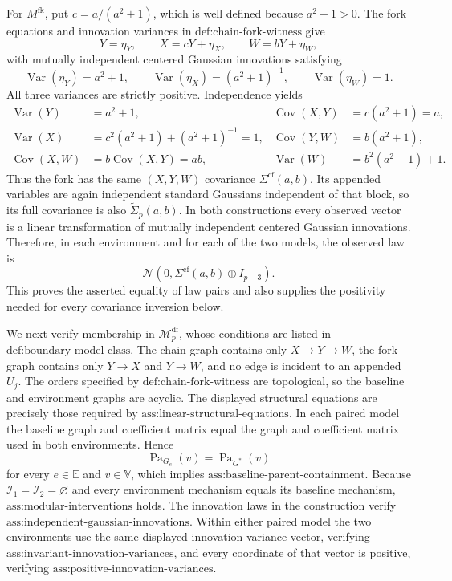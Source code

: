 For \(M^{\mathrm{fk}}\), put \(c=a/(a^2+1)\), which is well defined because \(a^2+1>0\). The fork equations and innovation variances in \(\text{def:chain-fork-witness}\) give
\[
Y=\eta_Y,\qquad X=cY+\eta_X,
\qquad W=bY+\eta_W,
\]
with mutually independent centered Gaussian innovations satisfying
\[
 \operatorname{Var}(\eta_Y)=a^2+1,
 \qquad \operatorname{Var}(\eta_X)=(a^2+1)^{-1},
 \qquad \operatorname{Var}(\eta_W)=1.
\]
All three variances are strictly positive. Independence yields
\[
\begin{aligned}
 \operatorname{Var}(Y)&=a^2+1,
 &\operatorname{Cov}(X,Y)&=c(a^2+1)=a,\\
 \operatorname{Var}(X)&=c^2(a^2+1)+(a^2+1)^{-1}=1,
 &\operatorname{Cov}(Y,W)&=b(a^2+1),\\
 \operatorname{Cov}(X,W)&=b\operatorname{Cov}(X,Y)=ab,
 &\operatorname{Var}(W)&=b^2(a^2+1)+1.
\end{aligned}
\]
Thus the fork has the same \((X,Y,W)\) covariance \(\Sigma^{\mathrm{cf}}(a,b)\). Its appended variables are again independent standard Gaussians independent of that block, so its full covariance is also \(\widetilde\Sigma_p(a,b)\). In both constructions every observed vector is a linear transformation of mutually independent centered Gaussian innovations. Therefore, in each environment and for each of the two models, the observed law is
\[
 \mathcal N\!\left(0,\Sigma^{\mathrm{cf}}(a,b)\oplus I_{p-3}\right).
\]
This proves the asserted equality of law pairs and also supplies the positivity needed for every covariance inversion below.

We next verify membership in \(\mathcal M_p^{\mathrm{df}}\), whose conditions are listed in \(\text{def:boundary-model-class}\). The chain graph contains only \(X\to Y\to W\), the fork graph contains only \(Y\to X\) and \(Y\to W\), and no edge is incident to an appended \(U_j\). The orders specified by \(\text{def:chain-fork-witness}\) are topological, so the baseline and environment graphs are acyclic. The displayed structural equations are precisely those required by \(\text{ass:linear-structural-equations}\). In each paired model the baseline graph and coefficient matrix equal the graph and coefficient matrix used in both environments. Hence
\[
 \operatorname{Pa}_{G_e}(v)=\operatorname{Pa}_{G^*}(v)
\]
for every \(e\in\mathbb E\) and \(v\in\mathbb V\), which implies \(\text{ass:baseline-parent-containment}\). Because \(\mathcal I_1=\mathcal I_2=\varnothing\) and every environment mechanism equals its baseline mechanism, \(\text{ass:modular-interventions}\) holds. The innovation laws in the construction verify \(\text{ass:independent-gaussian-innovations}\). Within either paired model the two environments use the same displayed innovation-variance vector, verifying \(\text{ass:invariant-innovation-variances}\), and every coordinate of that vector is positive, verifying \(\text{ass:positive-innovation-variances}\).

